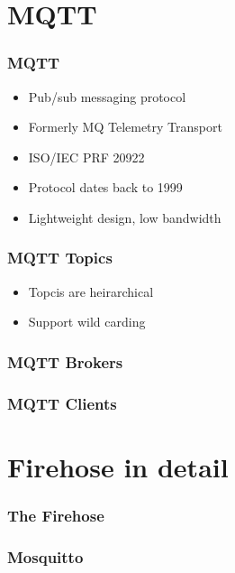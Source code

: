 \documentclass[aspectratio=169,11pt,hyperref={colorlinks=true}]{beamer}
\begin{document}
\section{MQTT}
\begin{frame}
	\frametitle{MQTT}
    \begin{itemize}
        \item Pub/sub messaging protocol
        \item Formerly MQ Telemetry Transport
        \item ISO/IEC PRF 20922
        \item Protocol dates back to 1999
        \item Lightweight design, low bandwidth
    \end{itemize}
\end{frame}

\begin{frame}
    \frametitle{MQTT Topics}
    \begin{itemize}
        \item Topcis are heirarchical
        \item Support wild carding
    \end{itemize}
\end{frame}

\begin{frame}
    \frametitle{MQTT Brokers}
\end{frame}

\begin{frame}
    \frametitle{MQTT Clients}

\end{frame}


\section{Firehose in detail}
\begin{frame}
    \frametitle{The Firehose}
\end{frame}

\begin{frame}
    \frametitle{Mosquitto}
\end{frame}
\end{document}
